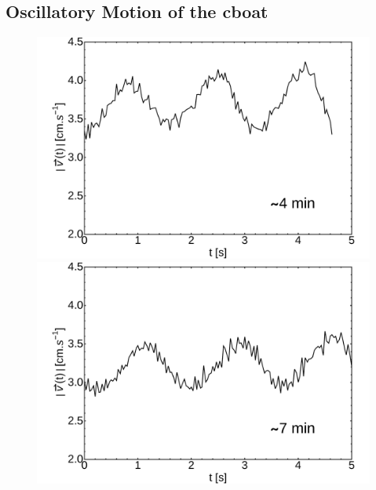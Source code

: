 \documentclass[journal=langd5, manuscript=article, layout=onecolumn]{achemso}
\begin{document}
\subsection{Oscillatory Motion of the cboat}
\label{sec:oscboat}
\begin{figure}[ht]
    \centering
	\begin{minipage}[c]{0.3\linewidth}
		\centering
		\includegraphics[width=\textwidth]{uvst_72dypcm_a.pdf}
	\end{minipage}
	\begin{minipage}[c]{0.3\linewidth}
		\centering
		\includegraphics[width=\textwidth]{uvst_72dypcm_b.pdf}
	\end{minipage}
	\begin{minipage}[c]{0.3\linewidth}
		\centering

\end{minipage}
\end{figure}
\end{document}
